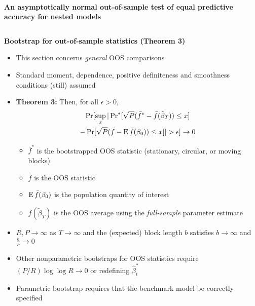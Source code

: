 \documentclass[final]{beamer}
\begin{document}
\begin{frame}{\\\centering \textbf{\huge An asymptotically normal out-of-sample
    test of equal predictive accuracy for nested models}}
\begin{columns}[t]
\begin{column}{.23\textwidth}
      \bigskip

      \begin{block}{\textbf{Bootstrap for out-of-sample statistics (Theorem 3)}}
        \begin{itemize}
        \item This section concerns \emph{general} OOS comparisons
        \item Standard moment, dependence, positive definiteness and
          smoothness conditions (still) assumed
        \item \textbf{Theorem 3:}
          Then, for all $\epsilon > 0$,
          \begin{multline*}
            \pr[\sup_x | \pr^*[\sqrt{P} (\bar{f}^* - \bar{f}(\tilde{\beta}_T))
            \leq x] \\ - \pr[\sqrt{P}( \bar{f} - \E \bar{f}(\btrue)) \leq x] | >
            \epsilon] \to 0
          \end{multline*}
          \begin{itemize}
          \item $\bar f^*$ is the bootstrapped OOS statistic
            (stationary, circular, or moving blocks)
          \item $\bar f$ is the OOS statistic
          \item $\operatorname{E} \bar f(\beta_0)$ is the population quantity of
            interest
          \item $\bar f(\tilde \beta_T)$ is the OOS average using
            the \emph{full-sample} parameter estimate
          \end{itemize}
        \item $R, P \to \infty$ as $T \to \infty$ and the (expected)
          block length $b$ satisfies $b \to \infty$ and $\frac{b}{P}
          \to 0$
        \item Other nonparametric bootstraps for OOS statistics
          require $(P/R) \log \log R \to 0$ or redefining
          $\hat\beta_t^*$
        \item Parametric bootstrap requires that the benchmark model
          be correctly specified
        \end{itemize}
      \end{block}
    \end{column}


\end{columns}
\end{frame}
\end{document}
